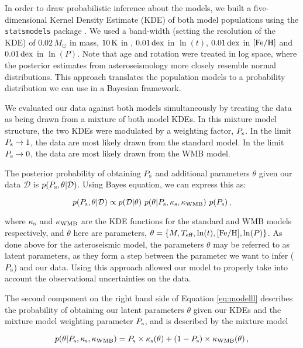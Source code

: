 In order to draw probabilistic inference about the models, we built a five-dimensional Kernel Density Estimate (KDE) of both model populations using the \texttt{statsmodels} package \cite{m_seabold+perktold2010}. We used a band-width (setting the resolution of the KDE) of $0.02\, M_\odot$ in mass, $10\, \rm K$ in \teff, $0.01\, \rm{dex}$ in $\ln(t)$, $0.01\, \rm{dex}$ in $\rm{[Fe/H]}$ and $0.01\, \rm{dex}$ in $\ln(P)$. Note that age and rotation were treated in log space, where the posterior estimates from asteroseismology more closely resemble normal distributions. This approach translates the population models to a probability distribution we can use in a Bayesian framework.

We evaluated our data against both models simultaneously by treating the data as being drawn from a mixture of both model KDEs. In this mixture model structure, the two KDEs were modulated by a weighting factor, $P_{\rm s}$. In the limit $P_{\rm s} \rightarrow 1$, the data are most likely drawn from the standard model. In the limit $P_{\rm s} \rightarrow 0$, the data are most likely drawn from the WMB model.

The posterior probability of obtaining $P_{\rm s}$ and additional parameters $\theta$ given our data $\mathcal{D}$ is $p(P_{\rm{s}}, \theta | \mathcal{D})$. Using Bayes equation, we can express this as:

\begin{equation}\label{eq:modelll}
	p(P_{\rm{s}}, \theta | \mathcal{D}) \propto p(\mathcal{D} | \theta)\ p(\theta | P_{\rm{s}}, \kappa_{\rm{s}}, \kappa_{\rm{WMB}})\ p(P_{\rm{s}})\, ,
\end{equation}

\noindent where $\kappa_{\rm{s}}$ and $\kappa_{\rm{WMB}}$ are the KDE functions for the standard and WMB models respectively, and $\theta$ here are parameters, $\theta = \{M, \mbox{$T_{\rm eff}$}, \ln(t), \mbox{$\rm{[Fe/H]}$}, \ln(P)\}$. As done above for the asteroseismic model, the parameters $\theta$ may be referred to as latent parameters, as they form a step between the parameter we want to infer ($P_{\rm{s}}$) and our data. Using this approach allowed our model to properly take into account the observational uncertainties on the data.

The second component on the right hand side of Equation \ref{eq:modelll} describes the probability of obtaining our latent parameters $\theta$ given our KDEs and the mixture model weighting parameter $P_{\rm s}$, and is described by the mixture model

\begin{equation}\label{eq:mixturell}
	p(\theta | P_{\rm{s}}, \kappa_{\rm{s}}, \kappa_{\rm{WMB}}) = P_{\rm s} \times \kappa_{\rm s}(\theta) + (1 - P_{\rm s}) \times \kappa_{\rm WMB}(\theta)\, ,
\end{equation}

